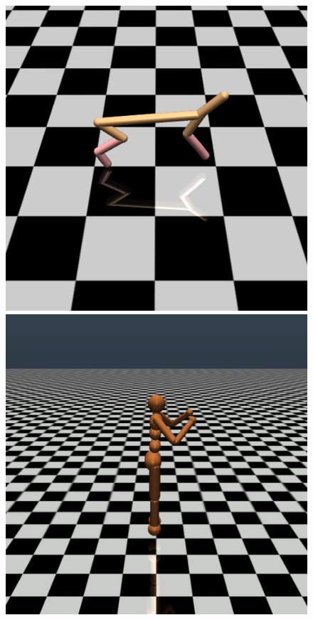 \begin{figure}[htb]
  \includegraphics[width=\linewidth]{images/cheetah.png}
\endminipage\hfill
{}
  \includegraphics[width=\linewidth]{images/humanoid.png}

\end{figure}
